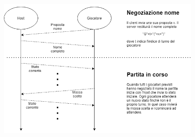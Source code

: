 \documentclass{article}
\begin{document}
\begin{figure}[h]
\centering
\includegraphics[width=0.9\textwidth]{Protocol.png}
\end{figure}
\end{document}
